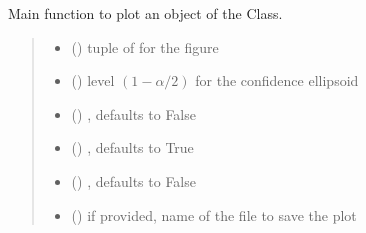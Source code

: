 \documentclass[letterpaper,10pt,english]{sphinxmanual}
\begin{document}
\begin{fulllineitems}
\begin{fulllineitems}
\label{\detokenize{cubmods:cubmods.cubsh.CUBresCUBSH.plot}}
\pysigstartsignatures
{}
\pysigstopsignatures
\sphinxAtStartPar
Main function to plot an object of the Class.
\begin{quote}\begin{description}
\begin{itemize}
\item {} 
\sphinxAtStartPar
{} () \textendash{} tuple of  for the figure

\item {} 
\sphinxAtStartPar
{} () \textendash{} level \((1-\alpha/2)\) for the confidence ellipsoid

\item {} 
\sphinxAtStartPar
{} () \textendash{} , defaults to False

\item {} 
\sphinxAtStartPar
{} () \textendash{} , defaults to True

\item {} 
\sphinxAtStartPar
{} () \textendash{} , defaults to False

\item {} 
\sphinxAtStartPar
{} () \textendash{} if provided, name of the file to save the plot


\end{itemize}
\end{description}
\end{quote}
\end{fulllineitems}
\end{fulllineitems}
\end{document}
